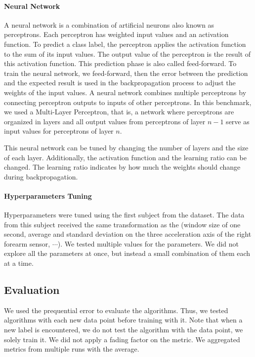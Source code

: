\paragraph{Neural Network}
A neural network is a combination of artificial
neurons also known as perceptrons. Each
perceptron has weighted input values and an
activation function. To predict a class label, the
perceptron applies the activation function to the sum
of its input values. The output
value of the perceptron is the result of this
activation function. This prediction phase is also
called feed-forward. To train the neural network,
we feed-forward, then the error between the
prediction and the expected result is used in the
backpropagation process to adjust the weights of
the input values.  A neural network combines
multiple perceptrons by connecting perceptron outputs
to inputs of other perceptrons.  In
this benchmark, we used a Multi-Layer Perceptron, 
that is, a network where perceptrons are organized in
layers and all output
values from perceptrons of layer $n-1$ serve as
input values for perceptrons of layer $n$. 

This neural network can be tuned by changing the
number of layers and the size of each layer.
Additionally, the activation function and the
learning ratio can be changed. The learning ratio
indicates by how much the weights should change
during backpropagation.

\paragraph{Hyperparameters Tuning}
Hyperparameters were tuned using the first
subject from the \banosdataset dataset.  The data from
this subject received the same transformation as
the \banosdataset (window size of one second,
average and standard deviation on the three
acceleration axis of the right forearm sensor,
$\cdots$). We tested multiple values for the
parameters.  We did
not explore all the parameters at once, but
instead a small combination of them each at a
time.

\subsection{Evaluation}
We used the prequential error to evaluate the algorithms. Thus, we tested
algorithms with each new data point before training with it. Note that when a
new label is encountered, we do not test the algorithm with the data point, we
solely train it. We did not apply a fading factor on the metric. We aggregated
metrics from multiple runs with the average.

